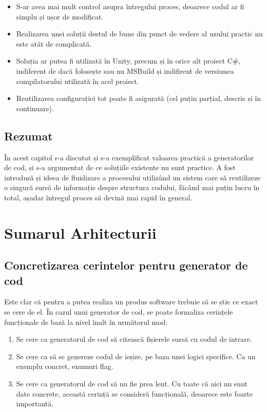 \documentclass{report}
\begin{document}
\begin{itemize}
  \item S-ar avea mai mult control asupra întregului proces, deoarece codul ar fi simplu și ușor de modificat.

  \item Realizarea unei soluții destul de bune din punct de vedere al uzului practic nu este atât de complicată.
  
  \item Soluția ar putea fi utilizată în Unity, precum și în orice alt proiect C\#, indiferent de dacă folosește sau nu MSBuild și indifirent de versiunea compilatorului utilizată în acel proiect.
  
  \item Reutilizarea configurației tot poate fi asigurată (cel puțin parțial, descris și în continuare). 
\end{itemize}

\section{Rezumat}

În acest capitol s-a discutat și s-a exemplificat valoarea practică a generatorilor de cod, și s-a argumentat de ce soluțiile existente nu sunt practice.
A fost introdusă și ideea de fluidizare a procesului utilizând un sistem care să reutilizeze o singură sursă de informație despre structura codului, făcând mai puțin lucru în total, așadar întregul proces să devină mai rapid în general.

\chapter{Sumarul Arhitecturii}

\section{Concretizarea cerintelor pentru generator de cod}

Este clar că pentru a putea realiza un produs software trebuie să se știe ce exact se cere de el.
În cazul unui generator de cod, se poate formaliza cerințele funcționale de bază la nivel înalt în următorul mod:

\begin{enumerate}
  \item Se cere ca generatorul de cod să citească fișierele sursă cu codul de intrare.
  \item Se cere ca să se genereze codul de ieșire, pe baza unei logici specifice. Ca un exemplu concret, enumuri flag.
  \item Se cere ca generatorul de cod să nu fie prea lent.
        Cu toate că aici nu sunt date concrete, această cerință se consideră funcțională, deoarece este foarte importantă.
\end{enumerate}
\end{document}
